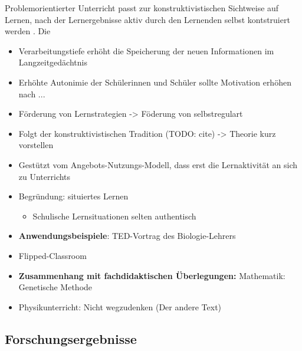 \documentclass[jour,12pt,a4paper]{apa6}
\begin{document}
Problemorientierter Unterricht passt zur konstruktivistischen Sichtweise auf Lernen, nach der Lernergebnisse aktiv durch den Lernenden selbst kontstruiert werden \parencite{reiss2012}. Die 

\begin{itemize}
  \item Verarbeitungstiefe erhöht die Speicherung der neuen Informationen im Langzeitgedächtnis\cite{seidel2014}
  \item Erhöhte Autonimie der Schülerinnen und Schüler sollte Motivation erhöhen nach ...
  \item Förderung von Lernstrategien -> Föderung von selbstregulart
  \item Folgt der konstruktivistischen Tradition (TODO: cite) -> Theorie kurz vorstellen
  \item Gestützt vom Angebots-Nutzungs-Modell, dass erst die Lernaktivität an sich zu Unterrichts
  \item Begründung: situiertes Lernen \cite{reusser2005}

    \begin{itemize}
      \item Schulische Lernsituationen selten authentisch
    \end{itemize}

  \item \textbf{Anwendungsbeispiele}: TED-Vortrag des Biologie-Lehrers
  \item Flipped-Classroom

  \item \textbf{Zusammenhang mit fachdidaktischen Überlegungen:} Mathematik: Genetische Methode
  \item Physikunterricht: Nicht wegzudenken (Der andere Text)
\end{itemize}

\subsection{Forschungsergebnisse}
\end{document}

